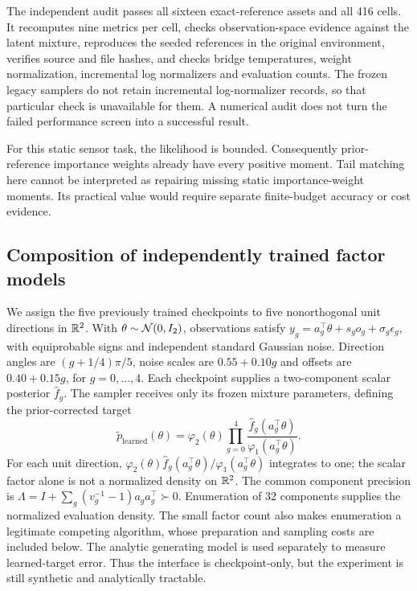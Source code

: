 The independent audit passes all sixteen exact-reference assets and all 416 cells. It recomputes nine metrics per cell, checks observation-space evidence against the latent mixture, reproduces the seeded references in the original environment, verifies source and file hashes, and checks bridge temperatures, weight normalization, incremental log normalizers and evaluation counts. The frozen legacy samplers do not retain incremental log-normalizer records, so that particular check is unavailable for them. A numerical audit does not turn the failed performance screen into a successful result.

For this static sensor task, the likelihood is bounded. Consequently prior-reference importance weights already have every positive moment. Tail matching here cannot be interpreted as repairing missing static importance-weight moments. Its practical value would require separate finite-budget accuracy or cost evidence.

\subsection{Composition of independently trained factor models}

We assign the five previously trained checkpoints to five nonorthogonal unit directions in $\mathbb R^2$. With $\theta\sim\mathcal N(0,I_2)$, observations satisfy $y_g=a_g^\top\theta+s_go_g+\sigma_g\epsilon_g$, with equiprobable signs and independent standard Gaussian noise. Direction angles are $(g+1/4)\pi/5$, noise scales are $0.55+0.10g$ and offsets are $0.40+0.15g$, for $g=0,\ldots,4$. Each checkpoint supplies a two-component scalar posterior $\widehat f_g$. The sampler receives only its frozen mixture parameters, defining the prior-corrected target
\[
 \widetilde p_{\mathrm{learned}}(\theta)=\varphi_2(\theta)
 \prod_{g=0}^4\frac{\widehat f_g(a_g^\top\theta)}{\varphi_1(a_g^\top\theta)}.
\]
For each unit direction, $\varphi_2(\theta)\widehat f_g(a_g^\top\theta)/\varphi_1(a_g^\top\theta)$ integrates to one; the scalar factor alone is not a normalized density on $\mathbb R^2$. The common component precision is $\Lambda=I+\sum_g(v_g^{-1}-1)a_ga_g^\top\succ0$. Enumeration of 32 components supplies the normalized evaluation density. The small factor count also makes enumeration a legitimate competing algorithm, whose preparation and sampling costs are included below. The analytic generating model is used separately to measure learned-target error. Thus the interface is checkpoint-only, but the experiment is still synthetic and analytically tractable.

